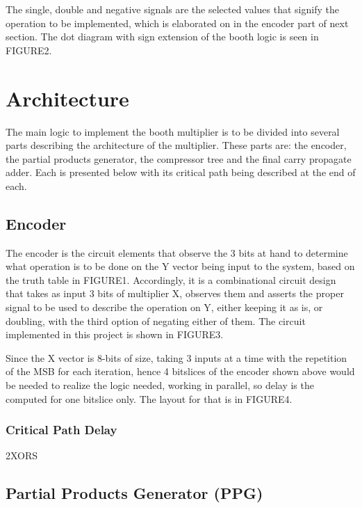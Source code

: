 \documentclass[conference]{IEEEtran}
\begin{document}
The single, double and negative signals are the selected values that signify the operation to be implemented, which is elaborated on in the encoder part of next section. The dot diagram with sign extension of the booth logic is seen in FIGURE2.





\section{Architecture}

The main logic to implement the booth multiplier is to be divided into several parts describing the architecture of the multiplier. These parts are: the encoder, the partial products generator, the compressor tree and the final carry propagate adder. Each is presented below with its critical path being described at the end of each.


\subsection{Encoder}

The encoder is the circuit elements that observe the 3 bits at hand to determine what operation is to be done on the Y vector being input to the system, based on the truth table in FIGURE1. Accordingly, it is a combinational circuit design that takes as input 3 bits of multiplier X, observes them and asserts the proper signal to be used to describe the operation on Y, either keeping it as is, or doubling, with the third option of negating either of them. The circuit implemented in this project is shown in FIGURE3.


Since the X vector is 8-bits of size, taking 3 inputs at a time with the repetition of the MSB for each iteration, hence 4 bitslices of the encoder shown above would be needed to realize the logic needed, working in parallel, so delay is the computed for one bitslice only. The layout for that is in FIGURE4.

\subsubsection{Critical Path Delay}

2XORS


\subsection{Partial Products Generator (PPG)}
\end{document}
